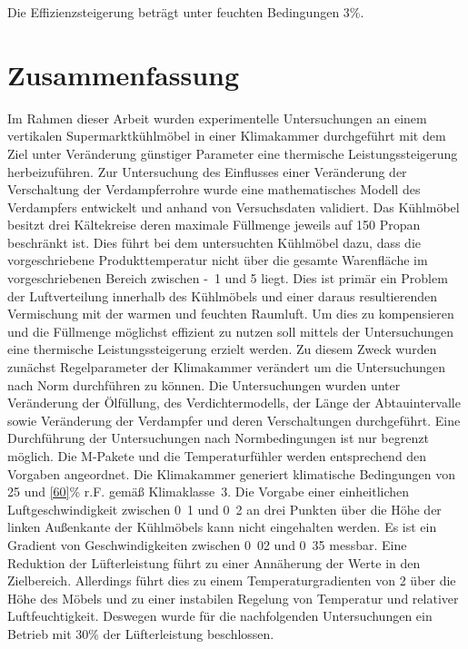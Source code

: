 Die Effizienzsteigerung beträgt unter feuchten Bedingungen \unit{3}{\%}. 



\chapter{Zusammenfassung}
\label{cha:Zusammenfassung}

Im Rahmen dieser Arbeit wurden experimentelle Untersuchungen an einem vertikalen Supermarktkühlmöbel in einer Klimakammer durchgeführt mit dem Ziel unter Veränderung günstiger Parameter eine thermische Leistungssteigerung herbeizuführen. Zur Untersuchung des Einflusses einer Veränderung der Verschaltung der Verdampferrohre wurde eine mathematisches Modell des Verdampfers entwickelt und anhand von Versuchsdaten validiert. \newline
Das Kühlmöbel besitzt drei Kältekreise deren maximale Füllmenge jeweils auf \unit{150}{\gram} Propan beschränkt ist. Dies führt bei dem untersuchten Kühlmöbel dazu, dass die vorgeschriebene Produkttemperatur nicht über die gesamte Warenfläche im vorgeschriebenen Bereich zwischen \unit{-1}{\celsius} und \unit{5}{\celsius} liegt. Dies ist primär ein Problem der Luftverteilung innerhalb des Kühlmöbels und einer daraus resultierenden Vermischung mit der warmen und feuchten Raumluft. Um dies zu kompensieren und die Füllmenge möglichst effizient zu nutzen soll mittels der Untersuchungen eine thermische Leistungssteigerung erzielt werden. Zu diesem Zweck wurden zunächst Regelparameter der Klimakammer verändert um die Untersuchungen nach Norm durchführen zu können. Die Untersuchungen wurden unter Veränderung der Ölfüllung, des Verdichtermodells, der Länge der Abtauintervalle sowie Veränderung der Verdampfer und deren Verschaltungen durchgeführt. \newline
Eine Durchführung der Untersuchungen nach Normbedingungen ist nur begrenzt möglich. Die M-Pakete und die Temperaturfühler werden entsprechend den Vorgaben angeordnet. Die Klimakammer generiert klimatische Bedingungen von \unit{25}{\celsius} und \ref{60}{\%} r.F. gemäß Klimaklasse~3. Die Vorgabe einer einheitlichen Luftgeschwindigkeit zwischen \unit{0.1}{\metre\per\second} und \unit{0.2}{\metre\per\second} an drei Punkten über die Höhe der linken Außenkante der Kühlmöbels kann nicht eingehalten werden. Es ist ein Gradient von Geschwindigkeiten zwischen \unit{0.02}{\metre\per\second} und \unit{0.35}{\metre\per\second} messbar. Eine Reduktion der Lüfterleistung führt zu einer Annäherung der Werte in den Zielbereich. Allerdings führt dies zu einem Temperaturgradienten von \unit{2}{\kelvin} über die Höhe des Möbels und zu einer instabilen Regelung von Temperatur und relativer Luftfeuchtigkeit. Deswegen wurde für die nachfolgenden Untersuchungen ein Betrieb mit \unit{30}{\%} der Lüfterleistung beschlossen. \newline
